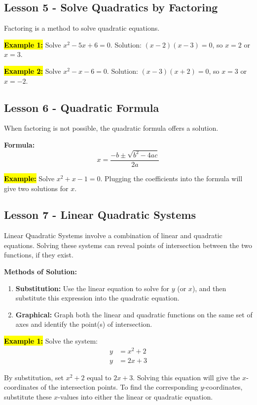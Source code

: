 \documentclass[12pt,a4paper]{article}
\begin{document}
\subsection*{Lesson 5 - Solve Quadratics by Factoring}
Factoring is a method to solve quadratic equations.

\textbf{\hl{Example 1:}} Solve \(x^2 - 5x + 6 = 0\). Solution: \((x - 2)(x - 3) = 0\), so \(x = 2\) or \(x = 3\).

\textbf{\hl{Example 2:}} Solve \(x^2 - x - 6 = 0\). Solution: \((x - 3)(x + 2) = 0\), so \(x = 3\) or \(x = -2\).

\subsection*{Lesson 6 - Quadratic Formula}
When factoring is not possible, the quadratic formula offers a solution.

\textbf{Formula:}
\[x = \frac{-b \pm \sqrt{b^2 - 4ac}}{2a}\]

\textbf{\hl{Example:}} Solve \(x^2 + x - 1 = 0\). Plugging the coefficients into the formula will give two solutions for \(x\).

\subsection*{Lesson 7 - Linear Quadratic Systems}

Linear Quadratic Systems involve a combination of linear and quadratic equations. Solving these systems can reveal points of intersection between the two functions, if they exist.

\textbf{Methods of Solution:}
\begin{enumerate}
    \item \textbf{Substitution:} Use the linear equation to solve for \(y\) (or \(x\)), and then substitute this expression into the quadratic equation.
    \item \textbf{Graphical:} Graph both the linear and quadratic functions on the same set of axes and identify the point(s) of intersection.
\end{enumerate}

\textbf{\hl{Example 1:}} Solve the system:
\[
\begin{aligned}
    y &= x^2 + 2 \\
    y &= 2x + 3
\end{aligned}
\]

By substitution, set \(x^2 + 2\) equal to \(2x + 3\). Solving this equation will give the \(x\)-coordinates of the intersection points. To find the corresponding \(y\)-coordinates, substitute these \(x\)-values into either the linear or quadratic equation.
\end{document}
